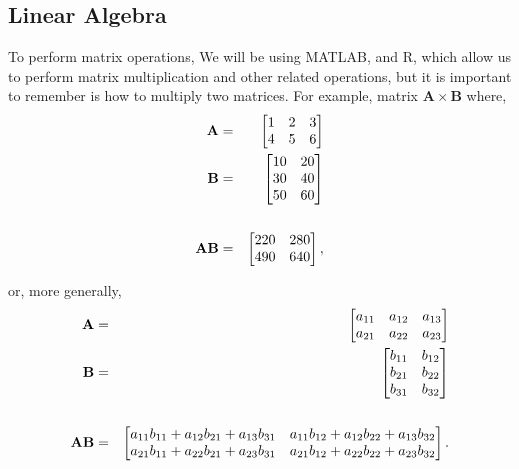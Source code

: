 \subsection{Linear Algebra}\label{linear-algebra}
To perform matrix operations, We will be using MATLAB, and R, which allow us to perform matrix multiplication and other related operations, but it is important to remember is how to multiply two matrices.
For example, matrix $\mathbf{A} \times \mathbf{B}$ where,
\begin{eqnarray}
	\label{eq:matmult}
\mathbf{A} &=& \notag
	\begin{bmatrix}
	1 & 2 & 3 \\
	4 & 5 & 6 \\
	\end{bmatrix} \\
\mathbf{B}&=&  \notag
	\begin{bmatrix}
	10 & 20 \\
	30 & 40 \\
	50 & 60 \\
	\end{bmatrix} \\
\\ \notag
\mathbf{A} \mathbf{B}&=&
	\begin{bmatrix}
	220 & 280 \\
	490 & 640 \\
	\end{bmatrix},
\end{eqnarray}

or, more generally,
\begin{eqnarray}
	\label{eq:matmultnum}
\mathbf{A} &=& \notag
	\begin{bmatrix}
	a_{11} & a_{12} & a_{13} \\
	a_{21} & a_{22} & a_{23} \\
	\end{bmatrix} \\
\mathbf{B}&=&  \notag
	\begin{bmatrix}
	b_{11} & b_{12} \\
	b_{21} & b_{22} \\
	b_{31} & b_{32} \\
	\end{bmatrix} \\
\\ \notag
\mathbf{A} \mathbf{B}&=&
	\begin{bmatrix}
	a_{11} b_{11} + a_{12} b_{21} + a_{13} b_{31} & a_{11} b_{12} + a_{12} b_{22} + a_{13} b_{32} \\
	a_{21} b_{11} + a_{22} b_{21} + a_{23} b_{31} & a_{21} b_{12} + a_{22} b_{22} + a_{23} b_{32} \\
	\end{bmatrix}.
\end{eqnarray}

